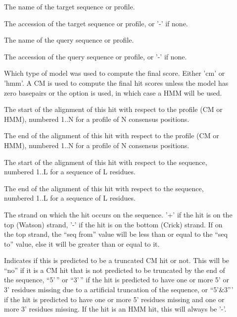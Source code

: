 \begin{description}
\item[]
  The name of the target sequence or profile. 

\item[]
  The accession of the target sequence or profile, or '-' if none.

\item[] 
  The name of the query sequence or profile.

\item[]
  The accession of the query sequence or profile, or '-' if none.

\item[] Which type of model was used to
  compute the final score. Either 'cm' or 'hmm'. A CM is
  used to compute the final hit scores unless the model has zero
  basepairs or the  option is used, in which case a
  HMM will be used. 

\item[]
  The start of the alignment of this hit with respect to the
  profile (CM or HMM), numbered 1..N for a profile of N consensus positions.

\item[]
  The end of the alignment of this hit with respect to the
  profile (CM or HMM), numbered 1..N for a profile of N consensus positions.

\item[]
  The start of the alignment of this hit with respect to the
  sequence, numbered 1..L for a sequence of L residues.
 
\item[]
  The end of the alignment of this hit with respect to the
  sequence, numbered 1..L for a sequence of L residues.

\item[]
  The strand on which the hit occurs on the sequence. '+' if the hit is on
  the top (Watson) strand, '-' if the hit is on the bottom (Crick) strand.
  If on the top strand, the ``seq from'' value will be less than or
  equal to the ``seq to'' value, else it will be greater than or equal
  to it. 

\item[] 
  Indicates if this is predicted to be a truncated CM hit or not. This will be
  ``no'' if it is a CM hit that is not predicted to be truncated by the end of the
  sequence, ``5'\,'' or ``3'\,'' if the hit is predicted to have one or more
  5' or 3' residues missing  due to a artificial truncation of the
  sequence, or ``5'\&3''' if the hit is predicted to have one or more
  5' residues missing and one or more 3' residues missing.
  If the hit is an HMM hit, this will always be '-'. 


\end{description}
